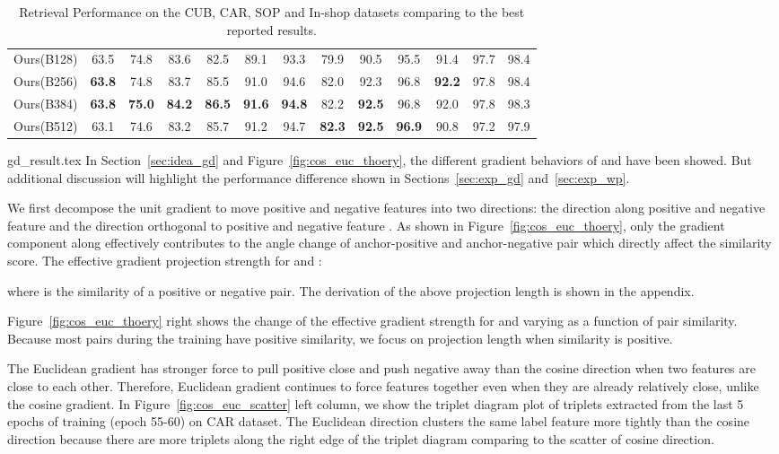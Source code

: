 \documentclass[10pt,twocolumn,letterpaper]{article}
\begin{document}
\begin{table*}[t]
\begin{adjustbox}{width=1.0\textwidth}
\begin{tabular}{l|ccc|ccc|ccc|ccc}
Ours(B128) 
& 63.5 & 74.8 & 83.6 & 82.5 & 89.1 & 93.3 & 79.9 & 90.5 & 95.5 & 91.4 & 97.7 & 98.4 \\
Ours(B256) 
& \bf{63.8} & 74.8 & 83.7 & 85.5 & 91.0 & 94.6 & 82.0 & 92.3 & 96.8 & \bf{92.2} & 97.8 & 98.4 \\
Ours(B384) 
& \bf{63.8} & \bf{75.0} & \bf{84.2} & \bf{86.5} & \bf{91.6} & \bf{94.8} & 82.2 & \bf{92.5} & 96.8 & 92.0 & 97.8 & 98.3 \\
Ours(B512) 
& 63.1 & 74.6 & 83.2 & 85.7 & 91.2 & 94.7 & \bf{82.3} & \bf{92.5} & \bf{96.9} & 90.8 & 97.2 & 97.9 \\
\hline
\end{tabular}
\end{adjustbox}
\caption{Retrieval Performance on the CUB, CAR, SOP and In-shop datasets comparing to the best reported results.}
\label{table:SOTA}
\end{table*} {gd_result.tex}
In Section~\ref{sec:idea_gd} and Figure~\ref{fig:cos_euc_thoery}, the different gradient behaviors of  and  have been showed.  But additional discussion 
will highlight the performance difference shown in Sections~\ref{sec:exp_gd} and~\ref{sec:exp_wp}.

We first decompose the unit gradient to move positive and negative features into two directions: the direction along positive and negative feature  and the direction orthogonal to positive and negative feature . As shown in Figure~\ref{fig:cos_euc_thoery}, only the gradient component along  effectively contributes to the angle change of anchor-positive and anchor-negative pair which directly affect the similarity score.  The effective gradient projection strength for  and :

 where  is the similarity of a positive or negative pair. The derivation of the above projection length is shown in the appendix.

Figure~\ref{fig:cos_euc_thoery} right shows the change of the effective gradient strength for  and  varying as a function of pair similarity. Because most pairs during the training have positive similarity, we focus on projection length when similarity is positive. 

The Euclidean gradient has stronger force to pull positive close and push negative away than the cosine direction when two features are close to each other. Therefore, Euclidean gradient continues to force features together even when they are already relatively close, unlike the cosine gradient. In Figure~\ref{fig:cos_euc_scatter} left column, we show the triplet diagram plot of triplets extracted from the last 5 epochs of training (epoch 55-60) on CAR dataset. The Euclidean direction clusters the same label feature more tightly than the cosine direction because there are more triplets along the right edge of the triplet diagram comparing to the scatter of cosine direction. 
\end{document}
